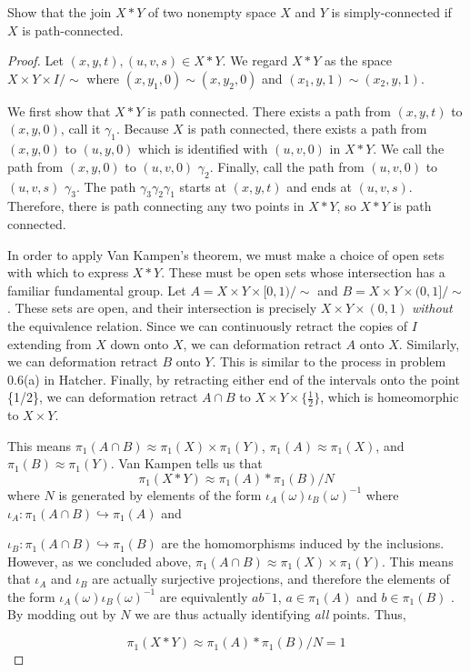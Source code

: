 \begin{homework}[e]
   Show that the join $X*Y$ of two nonempty space $X$ and $Y$ is simply-connected if $X$ is path-connected.
\begin{proof}
    Let $(x,y,t),(u,v,s) \in X * Y$. We regard $X * Y$ as the space $X \times Y \times I / \sim$ where $(x,y_1,0) \sim (x,y_2,0)$ and $(x_1,y,1) \sim (x_2,y,1)$.
    
    We first show that $X * Y$ is path connected.  There exists a path from $(x,y,t)$ to $(x,y,0)$, call it $\gamma_1$. Because $X$ is path connected, there exists a path from $(x,y,0)$ to $(u,y,0)$ which is identified with $(u,v,0)$ in $X * Y$. We call the path from $(x,y,0)$ to $(u,v,0)$ $\gamma_2$. Finally, call the path from $(u,v,0)$ to $(u,v,s)$ $\gamma_3$. The path $\gamma_3 \gamma_2 \gamma_1$ starts at $(x,y,t)$ and ends at $(u,v,s)$. Therefore, there is path connecting any two points in $X*Y$, so $X*Y$ is path connected.  
    
    In order to apply Van Kampen's theorem, we must make a choice of open sets with which to express $X * Y$. These must be open sets whose intersection has a familiar fundamental group. Let $A = X \times Y \times [0,1) / \sim$ and $B = X \times Y \times (0,1] / \sim$. These sets are open, and their intersection is precisely $X \times Y \times (0,1)$ \emph{without} the equivalence relation. Since we can continuously retract the copies of $I$ extending from $X$ down onto $X$, we can deformation retract $A$ onto $X$. Similarly, we can deformation retract $B$ onto $Y$. This is similar to the process in problem 0.6(a) in Hatcher. Finally, by retracting either end of the intervals onto the point \{1/2\}, we can deformation retract $A \cap B$ to $X \times Y \times \{\frac{1}{2}\}$, which is homeomorphic to $X \times Y$. 
    
    This means $\pi_1(A \cap B) \approx \pi_1(X) \times \pi_1(Y)$, $\pi_1(A) \approx \pi_1(X)$, and $\pi_1(B) \approx \pi_1(Y)$. Van Kampen tells us that 
    \begin{equation*}
        \pi_1(X*Y) \approx \pi_1(A) * \pi_1(B) / N 
    \end{equation*}
    where $N$ is generated by elements of the form $\iota_A(\omega)\iota_B(\omega)^{-1}$ where $\iota_A: \pi_1(A \cap B) \hookrightarrow \pi_1(A)$ and 
    
    \noindent
    $\iota_B: \pi_1(A \cap B) \hookrightarrow \pi_1(B)$ are the homomorphisms induced by the inclusions. However, as we concluded above, $\pi_1(A \cap B) \approx \pi_1(X) \times \pi_1(Y)$. This means that $\iota_A$ and $\iota_B$ are actually surjective projections, and therefore the elements of the form $\iota_A(\omega)\iota_B(\omega)^{-1}$ are equivalently $ab^-1$, $a \in \pi_1(A)$ and $b \in \pi_1(B)$ . By modding out by $N$ we are thus actually identifying \emph{all} points. Thus, 
    
    \begin{equation*}
        \pi_1(X * Y) \approx \pi_1(A) * \pi_1(B) / N = 1
    \end{equation*}
\end{proof}
\end{homework}

